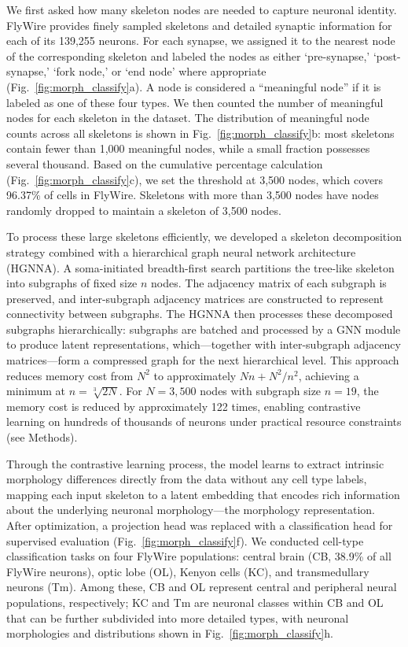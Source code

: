 \documentclass[10pt]{article}
\begin{document}
We first asked how many skeleton nodes are needed to capture neuronal identity. FlyWire provides finely sampled skeletons and detailed synaptic information for each of its 139,255 neurons. For each synapse, we assigned it to the nearest node of the corresponding skeleton and labeled the nodes as either `pre-synapse,' `post-synapse,' `fork node,' or `end node' where appropriate (Fig.~\ref{fig:morph_classify}a). A node is considered a ``meaningful node'' if it is labeled as one of these four types. We then counted the number of meaningful nodes for each skeleton in the dataset. The distribution of meaningful node counts across all skeletons is shown in Fig.~\ref{fig:morph_classify}b: most skeletons contain fewer than 1,000 meaningful nodes, while a small fraction possesses several thousand. Based on the cumulative percentage calculation (Fig.~\ref{fig:morph_classify}c), we set the threshold at 3,500 nodes, which covers 96.37\% of cells in FlyWire. Skeletons with more than 3,500 nodes have nodes randomly dropped to maintain a skeleton of 3,500 nodes.

To process these large skeletons efficiently, we developed a skeleton decomposition strategy combined with a hierarchical graph neural network architecture (HGNNA). A soma-initiated breadth-first search partitions the tree-like skeleton into subgraphs of fixed size $n$ nodes. The adjacency matrix of each subgraph is preserved, and inter-subgraph adjacency matrices are constructed to represent connectivity between subgraphs. The HGNNA then processes these decomposed subgraphs hierarchically: subgraphs are batched and processed by a GNN module to produce latent representations, which---together with inter-subgraph adjacency matrices---form a compressed graph for the next hierarchical level. This approach reduces memory cost from $N^2$ to approximately $Nn + N^2/n^2$, achieving a minimum at $n = \sqrt[3]{2N}$. For $N = 3{,}500$ nodes with subgraph size $n = 19$, the memory cost is reduced by approximately 122 times, enabling contrastive learning on hundreds of thousands of neurons under practical resource constraints (see Methods).

Through the contrastive learning process, the model learns to extract intrinsic morphology differences directly from the data without any cell type labels, mapping each input skeleton to a latent embedding that encodes rich information about the underlying neuronal morphology---the morphology representation. After optimization, a projection head was replaced with a classification head for supervised evaluation (Fig.~\ref{fig:morph_classify}f). We conducted cell-type classification tasks on four FlyWire populations: central brain (CB, 38.9\% of all FlyWire neurons), optic lobe (OL), Kenyon cells (KC), and transmedullary neurons (Tm). Among these, CB and OL represent central and peripheral neural populations, respectively; KC and Tm are neuronal classes within CB and OL that can be further subdivided into more detailed types, with neuronal morphologies and distributions shown in Fig.~\ref{fig:morph_classify}h.
\end{document}
